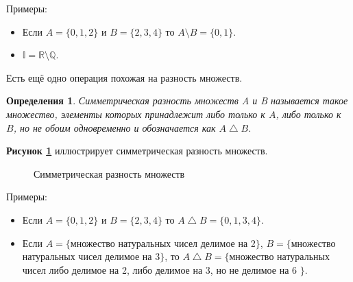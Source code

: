 \documentclass[a4paper, 16pt, oneside]{book}
\newtheorem{Definition}{Определения}[theorem]
\begin{document}
\par Примеры:
\begin{itemize}
    \item Если \(A = \{0, 1, 2\}\) и \(B = \{2, 3, 4\}\) то \(A \setminus B = \{0, 1\}\).
    \item \(\mathbb{I} = \mathbb{R} \setminus \mathbb{Q}\).
\end{itemize}

\par Есть ещё одно операция похожая на разность множеств.
\begin{Definition}
    \label{definiton:symmetric_difference}
    Симметрическая разность множеств A и B называется такое множество, элементы которых принадлежит либо только к \(A\),
    либо только к \(B\), но не обоим одновременно и обозначается как \(A \bigtriangleup B\).
\end{Definition}

\par \textbf{Рисунок \ref{picture:set:symmetric_difference}} иллюстрирует симметрическая разность множеств.
\begin{figure}
    \centering
    \caption{Симметрическая разность множеств}
    \label{picture:set:symmetric_difference}
\end{figure}

\par Примеры:
\begin{itemize}
    \item Если \(A = \{0, 1, 2\}\) и \(B = \{2, 3, 4\}\) то \(A \bigtriangleup B = \{0, 1, 3, 4\}\).
    \item Если \(A = \{\)множество натуральных чисел делимое на 2\(\}\), \(B = \{\)множество натуральных чисел делимое на 3\(\}\), то
        \(A \bigtriangleup B = \{\)множество натуральных чисел либо делимое на 2, либо делимое на 3, но не делимое на 6 \(\}\).
\end{itemize}

\end{document}
